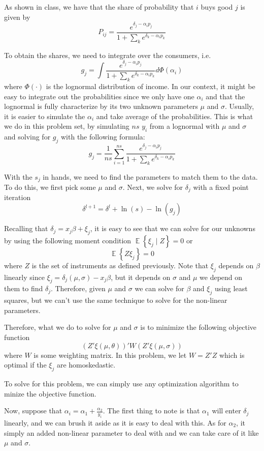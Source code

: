 \documentclass[12pt]{article}
\newcommand{\1}{{\bf 1}} %
\DeclareMathOperator{\E}{\mathbb{E}} %
\newcommand{\Ex}[1]{\E\left\{#1\right\}} %
\begin{document}
As shown in class, we have that the share of probability that $i$ buys good $j$ is given by
\[
P_{ij} = \frac{e^{\delta_j -\alpha_i p_j }}{1+\sum_k e^{\delta_k-\alpha_i p_k}}
\]

To obtain the shares, we need to integrate over the consumers, i.e.
\[
g_j = \int \frac{e^{\delta_j -\alpha_i p_j }}{1+\sum_k e^{\delta_k -\alpha_i p_k}} d\Phi(\alpha_i)
\]
where $\Phi(\cdot)$ is the lognormal distribution of income. In our context, it might be easy to integrate out the probabilities since we only have one $\alpha_i$ and that the lognormal is fully characterize by its two unknown parameters $\mu$ and $\sigma$. Usually, it is easier to simulate the $\alpha_i$ and take average of the probabilities. This is what we do in this problem set, by simulating $ns$ $y_i$ from a lognormal with $\mu$ and $\sigma$ and solving for $g_j$ with the following formula:
\[
g_j= \frac{1}{ns}\sum_{i=1}^{ns}\frac{e^{\delta_j -\alpha_i p_j }}{1+\sum_k e^{\delta_k -\alpha_i p_k}}
\]

With the $s_j$ in hands, we need to find the parameters to match them to the data. To do this, we first pick some $\mu$ and $\sigma$. Next, we solve for $\delta_j$ with a fixed point iteration
\[
\delta^{l+1} = \delta^{l} + \ln(s)-\ln(g_j)
\]

Recalling that $\delta_j = x_j\beta +\xi_j $, it is easy to see that we can solve for our unknowns by using the following moment condition $\Ex{\xi_j\mid Z}=0$ or
\[
\Ex{Z\xi_j } =0
\]
where $Z$ is the set of instruments as defined previously. Note that $\xi_j$ depends on $\beta$ linearly since $\xi_j = \delta_j(\mu,\sigma)-x_j\beta$, but it depends on $\sigma$ and $\mu$ we depend on them to find $\delta_j$. Therefore, given $\mu$ and $\sigma$ we can solve for $\beta$ and $\xi_j$ using least squares, but we can't use the same technique to solve for the non-linear parameters.

Therefore, what we do to solve for $\mu$ and $\sigma$ is to minimize the following objective function
\[
(Z'\xi(\mu,\theta))'W(Z'\xi(\mu,\sigma))
\]
where $W$ is some weighting matrix. In this problem, we let $W=Z'Z$ which is optimal if the $\xi_j$ are homoskedastic.

To solve for this problem, we can simply use any optimization algorithm to minize the objective function.

Now, suppose that $\alpha_i = \alpha_1 + \frac{\alpha_2}{y_i}$. The first thing to note is that $\alpha_1$ will enter $\delta_j$ linearly, and we can brush it aside as it is easy to deal with this. As for $\alpha_2$, it simply an added non-linear parameter to deal with and we can take care of it like $\mu$ and $\sigma$.
\end{document}
